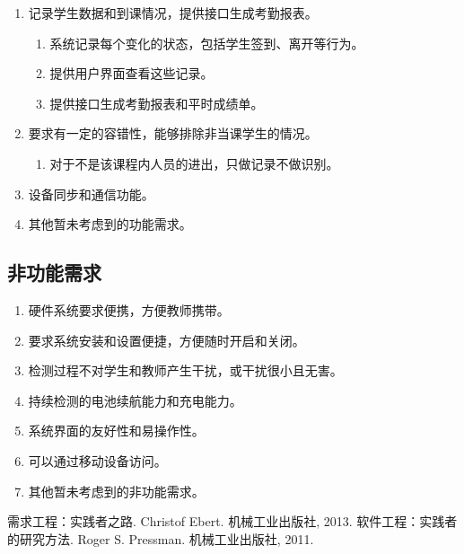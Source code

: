 \documentclass[cs4size,a4paper,nofonts]{ctexart}
\begin{document}
\begin{enumerate}
\begin{enumerate}
\end{enumerate}
\item 记录学生数据和到课情况，提供接口生成考勤报表。
\begin{enumerate}
\item 系统记录每个变化的状态，包括学生签到、离开等行为。
\item 提供用户界面查看这些记录。
\item 提供接口生成考勤报表和平时成绩单。
\end{enumerate}
\item 要求有一定的容错性，能够排除非当课学生的情况。
\begin{enumerate}
\item 对于不是该课程内人员的进出，只做记录不做识别。
\end{enumerate}
\item 设备同步和通信功能。
\item 其他暂未考虑到的功能需求。
\end{enumerate}

\subsection{非功能需求}

\begin{enumerate}
\item 硬件系统要求便携，方便教师携带。
\item 要求系统安装和设置便捷，方便随时开启和关闭。
\item 检测过程不对学生和教师产生干扰，或干扰很小且无害。
\item 持续检测的电池续航能力和充电能力。
\item 系统界面的友好性和易操作性。
\item 可以通过移动设备访问。
\item 其他暂未考虑到的非功能需求。
\end{enumerate}

\begin{thebibliography}{10}
 需求工程：实践者之路. Christof Ebert. 机械工业出版社, 2013.
 软件工程：实践者的研究方法. Roger S. Pressman. 机械工业出版社, 2011.
\end{thebibliography}
\end{document}
